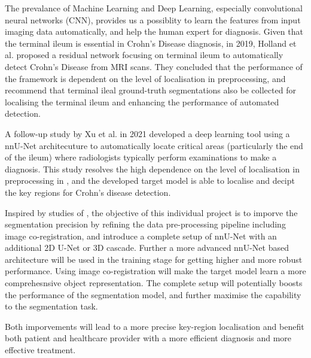 \noindent The prevalance of Machine Learning and Deep Learning, especially convolutional neural networks (CNN), provides us a possiblity to learn the features from input imaging data automatically, and help the human expert for diagnosis. Given that the terminal ileum is essential in Crohn's Disease diagnosis, in 2019, Holland et al. \cite{holland2019automatic} proposed a residual network focusing on terminal ileum to automatically detect Crohn's Disease from MRI scans. They concluded that the performance of the framework is dependent on the level of localisation in preprocessing, and recommend that terminal ileal ground-truth segmentations also be collected for localising the terminal ileum and enhancing the performance of automated detection. \medskip

\noindent A follow-up study by Xu et al. \cite{KeXu2021} in 2021 developed a deep learning tool using a nnU-Net architecuture to automatically locate critical areas (particularly the end of the ileum) where radiologists typically perform examinations to make a diagnosis. This study resolves the high dependence on the level of localisation in preprocessing in \cite{holland2019automatic}, and the developed target model is able to localise and decipt the key regions for Crohn's disease detection. \medskip

\noindent Inspired by studies of \cite{holland2019automatic,KeXu2021}, the objective of this individual project is to imporve the segmentation precision by refining the data pre-processing pipeline including image co-registration, and introduce a complete setup of nnU-Net with an additional 2D U-Net or 3D cascade. Further a more advanced nnU-Net based architecture will be used in the training stage for getting higher and more robust performance. Using image co-registration will make the target model learn a more comprehesnsive object representation. The complete setup will potentially boosts the performance of the segmentation model, and further maximise the capability to the segmentation task. \medskip

\noindent Both imporvements will lead to a more precise key-region localisation and benefit both patient and healthcare provider with a more efficient diagnosis and more effective treatment.
